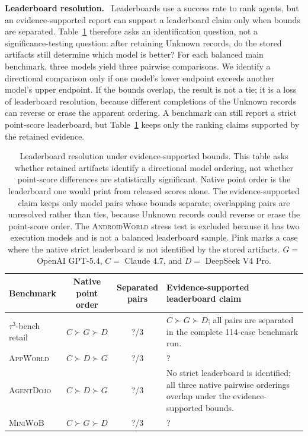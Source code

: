\documentclass{article}
\newcommand{\agentdojo}{\textsc{AgentDojo}\xspace}
\newcommand{\appworld}{\textsc{AppWorld}\xspace}
\newcommand{\tauthree}{\(\tau^3\)-bench retail\xspace}
\newcommand{\androidworld}{\textsc{AndroidWorld}\xspace}
\newcommand{\miniwob}{\textsc{MiniWoB}\xspace}
\newcommand{\fillfromdata}{\textsc{\color{red}?}}
\newcommand{\paperupdate}[1]{\textcolor{revisionblue}{#1}}
\newcommand{\runin}[1]{\noindent\textbf{#1}\ }
\providecommand{\ADJIdentifiedPairs}{\fillfromdata}
\providecommand{\APPIdentifiedPairs}{\fillfromdata}
\providecommand{\APPRankingTakeaway}{\fillfromdata}
\providecommand{\MWBIdentifiedPairs}{\fillfromdata}
\providecommand{\MWBRankingTakeaway}{\fillfromdata}
\providecommand{\TAUIdentifiedPairs}{\fillfromdata}
\begin{document}
\runin{Leaderboard resolution.}
Leaderboards use a success rate to rank agents, but an evidence-supported
report can support a leaderboard claim only when bounds are
separated. Table~\ref{tab:main-results-C} therefore asks an identification
question, not a significance-testing question: after retaining Unknown records,
do the stored artifacts still determine which model is better? For each
balanced main benchmark, three models yield three pairwise comparisons. We identify a
directional comparison only if one model's lower endpoint exceeds another
model's upper endpoint. If the bounds overlap, the result is not a tie; it is a
loss of leaderboard resolution, because different completions of the Unknown
records can reverse or erase the apparent ordering. A benchmark can still
report a strict point-score leaderboard, but Table~\ref{tab:main-results-C}
keeps only the ranking claims supported by the retained evidence.

\begin{table}[t]
\centering
\caption{Leaderboard resolution under evidence-supported bounds. This table
asks whether retained artifacts identify a directional model ordering, not
whether point-score differences are statistically significant. Native point
order is the leaderboard one would print from released scores alone. The
evidence-supported claim keeps only model pairs whose bounds separate;
overlapping pairs are unresolved rather than ties, because Unknown records could
reverse or erase the point-score order. The \androidworld stress test is
excluded because it has two execution models and is not a balanced leaderboard
sample. Pink marks a case where the native strict leaderboard is not identified
by the stored artifacts. \(G=\) OpenAI GPT-5.4, \(C=\) Claude 4.7, and
\(D=\) DeepSeek V4 Pro.}
\label{tab:main-results-C}
\footnotesize
\setlength{\tabcolsep}{4pt}
\renewcommand{\arraystretch}{1.14}
\begin{tabularx}{\textwidth}{@{}lccX@{}}
\toprule
Benchmark & \makecell{Native\\point order} & \makecell{Separated\\pairs} & Evidence-supported leaderboard claim \\
\midrule
\tauthree & \(C \succ G \succ D\) & \TAUIdentifiedPairs/3 & \paperupdate{\(C \succ G \succ D\); all pairs are separated in the complete 114-case benchmark run.} \\
\appworld & \(C \succ D \succ G\) & \APPIdentifiedPairs/3 & \APPRankingTakeaway \\
\rowcolor{problemrow}
\agentdojo & \(C \succ D \succ G\) & \ADJIdentifiedPairs/3 & No strict leaderboard is identified; all three native pairwise orderings overlap under the evidence-supported bounds. \\
\miniwob & \paperupdate{\(C \succ G \succ D\)} & \MWBIdentifiedPairs/3 & \MWBRankingTakeaway \\
\bottomrule
\end{tabularx}
\end{table}
\end{document}
